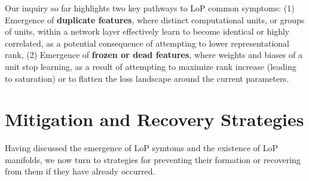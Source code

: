 \documentclass{article}
\numberwithin{figure}{section}
\begin{document}
Our inquiry so far highlights two key pathways to LoP common symptoms:
    (1) Emergence of \textbf{duplicate features}, where distinct computational units, or groups of units, within a network layer effectively learn to become identical or highly correlated, as a potential consequence of attempting to lower representational rank, 
    (2) Emergence of \textbf{frozen or dead features}, where weights and biases of a unit stop learning, as a result of attempting to maximize rank increase (leading to saturation) or to flatten the loss landscape around the current parameters.
\section{Mitigation and Recovery Strategies}
\label{sec:mitigation_recovery}
\label{sec:mitigate}
Having discussed the emergence of LoP symtoms and the existence of LoP manifolds, we now turn to strategies for preventing their formation or recovering from them if they have already occurred.

\vspace{-7pt}
\end{document}
